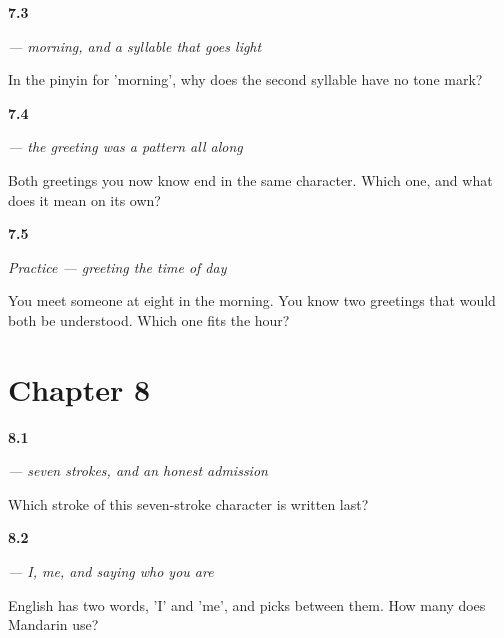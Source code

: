 \noindent\begin{minipage}[t]{\linewidth}
\raggedright
\hypertarget{review-ZH-C07-zaoshang-neutral}{\textbf{7.3}} \emph{ — morning, and a syllable that goes light}\par
\small In the pinyin for 'morning', why does the second syllable have no tone mark?
\end{minipage}\par\medskip

\noindent\begin{minipage}[t]{\linewidth}
\raggedright
\hypertarget{review-ZH-C07-zaoshanghao-frame}{\textbf{7.4}} \emph{ — the greeting was a pattern all along}\par
\small Both greetings you now know end in the same character. Which one, and what does it mean on its own?
\end{minipage}\par\medskip

\noindent\begin{minipage}[t]{\linewidth}
\raggedright
\hypertarget{review-ZH-C07-practice-choice}{\textbf{7.5}} \emph{Practice — greeting the time of day}\par
\small You meet someone at eight in the morning. You know two greetings that would both be understood. Which one fits the hour?
\end{minipage}\par\medskip

\section*{Chapter 8}

\noindent\begin{minipage}[t]{\linewidth}
\raggedright
\hypertarget{review-ZH-W08-wo-dot}{\textbf{8.1}} \emph{ — seven strokes, and an honest admission}\par
\small Which stroke of this seven-stroke character is written last?
\end{minipage}\par\medskip

\noindent\begin{minipage}[t]{\linewidth}
\raggedright
\hypertarget{review-ZH-C08-wo-both}{\textbf{8.2}} \emph{ — I, me, and saying who you are}\par
\small English has two words, 'I' and 'me', and picks between them. How many does Mandarin use?
\end{minipage}\par\medskip

